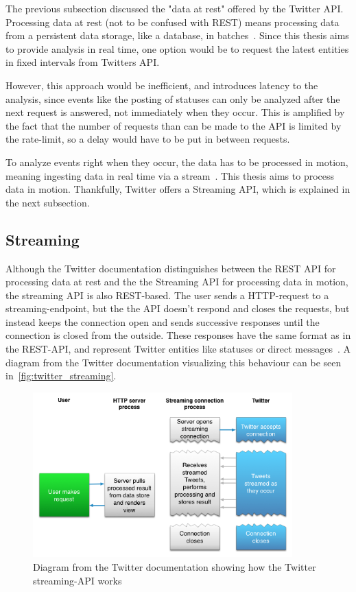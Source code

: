 The previous subsection discussed the "data at rest" offered by the Twitter API.
Processing data at rest (not to be confused with REST) means processing data from a persistent data storage, like a database, in batches~\cite{Nandi2015}.
Since this thesis aims to provide analysis in real time, one option would be to request the latest entities in fixed intervals from
Twitters API.
\par
However, this approach would be inefficient, and introduces latency to the analysis,
since events like the posting of statuses can only be analyzed after the next request is answered, not immediately when they occur.
This is amplified by the fact that the number of requests than can be made to the API is limited by the rate-limit,
so a delay would have to be put in between requests.
\par
To analyze events right when they occur, the data has to be processed in motion, meaning ingesting data in real time via a stream~\cite{Nandi2015}.
This thesis aims to process data in motion.
Thankfully, Twitter offers a Streaming API, which is explained in the next subsection.


\subsection{Streaming}
\label{subsec:streaming}

Although the Twitter documentation distinguishes between the REST API for processing data at rest and the the Streaming API for processing data in motion,
the streaming API is also REST-based.
The user sends a HTTP-request to a streaming-endpoint, but the the API doesn't respond and closes the requests,
but instead keeps the connection open and sends successive responses until the connection is closed from the outside.
These responses have the same format as in the REST-API, and represent Twitter entities like statuses or direct messages~\cite{twitterDocs}.
A diagram from the Twitter documentation visualizing this behaviour can be seen in~\autoref{fig:twitter_streaming}.

\begin{figure}
    \centering
    \caption{Diagram from the Twitter documentation showing how the Twitter streaming-API works~\cite{twitterDocs}}
    \label{fig:twitter_streaming}
    \includegraphics[width=10cm]{../images/twitter_streaming_diagram.png}
\end{figure}

